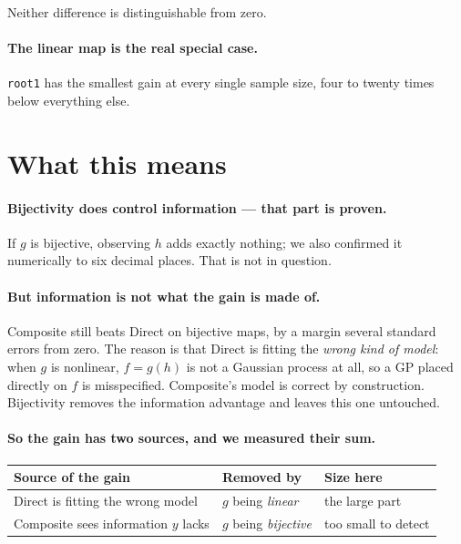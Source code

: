 \documentclass[11pt]{article}
\begin{document}
\noindent Neither difference is distinguishable from zero.

\paragraph{The linear map is the real special case.} \texttt{root1} has the
smallest gain at every single sample size, four to twenty times below
everything else.

\section{What this means}

\paragraph{Bijectivity does control information --- that part is proven.} If
$g$ is bijective, observing $h$ adds exactly nothing; we also confirmed it
numerically to six decimal places. That is not in question.

\paragraph{But information is not what the gain is made of.} Composite still
beats Direct on bijective maps, by a margin several standard errors from zero.
The reason is that Direct is fitting the \emph{wrong kind of model}: when $g$
is nonlinear, $f=g(h)$ is not a Gaussian process at all, so a GP placed
directly on $f$ is misspecified. Composite's model is correct by construction.
Bijectivity removes the information advantage and leaves this one untouched.

\paragraph{So the gain has two sources, and we measured their sum.}
\begin{center}
\begin{tabular}{lll}
\toprule
Source of the gain & Removed by & Size here \\
\midrule
Direct is fitting the wrong model & $g$ being \emph{linear} & the large part \\
Composite sees information $y$ lacks & $g$ being \emph{bijective} & too small to detect \\
\bottomrule
\end{tabular}
\end{center}
\end{document}
